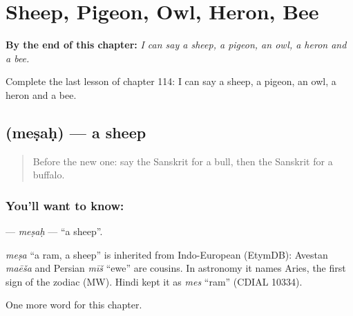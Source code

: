 
\chapter{Sheep, Pigeon, Owl, Heron, Bee}
\label{ch:sa-sheep-pigeon-owl-heron-bee}

\begin{chapteropening}
\textbf{By the end of this chapter:} \emph{I can say a sheep, a pigeon, an owl, a heron and a bee.}

Complete the last lesson of chapter 114: I can say a sheep, a pigeon, an owl, a heron and a bee.
\end{chapteropening}

\section[\texorpdfstring{\sk{मेषः} (meṣaḥ)}{मेषः (meṣaḥ)}]{ (meṣaḥ) — a sheep}

\label{lesson:SA-C114-mesah}



\begin{quote}
Before the new one: say the Sanskrit for a bull, then the Sanskrit for a buffalo.
\end{quote}

\subsection*{You'll want to know: }
\textbf{} — \emph{meṣaḥ} — \textquotedblleft{}a sheep\textquotedblright{}.

\begin{cousinweb}
\emph{meṣa} \textquotedblleft{}a ram, a sheep\textquotedblright{} is inherited from Indo-European (EtymDB): Avestan \emph{maēša} and Persian \emph{mīš} \textquotedblleft{}ewe\textquotedblright{} are cousins. In astronomy it names Aries, the first sign of the zodiac (MW). Hindi kept it as \emph{mes} \textquotedblleft{}ram\textquotedblright{} (CDIAL 10334).
\end{cousinweb}

\begin{grammarlens}[title={What you've built}]
One more word for this chapter.
\end{grammarlens}


